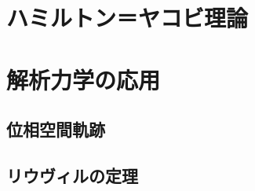 \documentclass[a4paper]{jsreport}
\begin{document}
    \chapter{ハミルトン＝ヤコビ理論}

    \chapter{解析力学の応用}
        \section{位相空間軌跡}
        \section{リウヴィルの定理}
\end{document}
